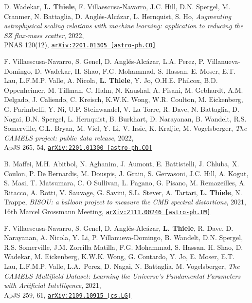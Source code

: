 D. Wadekar, {\bf L. Thiele}, F. Villaescusa-Navarro, J.C. Hill, D.N. Spergel,
M. Cranmer, N. Battaglia, D. Angl\'es-Alc\'azar, L. Hernquist, S. Ho,
\emph{Augmenting astrophysical scaling relations with machine learning:
      application to reducing the SZ flux-mass scatter}, 2022,\\
PNAS 120(12),
\href{https://arxiv.org/abs/2201.01305}{\mbox{\texttt{arXiv:2201.01305 [astro-ph.CO]}}}

F. Villaescusa-Navarro, S. Genel, D. Angl\'es-Alc\'azar,
L.A. Perez, P. Villanueva-Domingo, D. Wadekar, H. Shao,
F.G. Mohammad, S. Hassan, E. Moser, E.T. Lau, L.F.M.P. Valle, A. Nicola,
{\bf L. Thiele}, Y. Jo, O.H.E. Philcox, B.D. Oppenheimer, M. Tillman, C. Hahn,
N. Kaushal, A. Pisani, M. Gebhardt, A.M. Delgado, J. Caliendo,
C. Kreisch, K.W.K. Wong, W.R. Coulton, M. Eickenberg,
G. Parimbelli, Y. Ni, U.P. Steinwandel, V. La Torre,
R. Dave, N. Battaglia, D. Nagai, D.N. Spergel, L. Hernquist, B. Burkhart,
D. Narayanan, B. Wandelt, R.S. Somerville, G.L. Bryan, M. Viel, Y. Li, V. Irsic,
K. Kraljic, M. Vogelsberger,
\emph{The CAMELS project: public data release}, 2022,\\
ApJS 265, 54,
\href{https://arxiv.org/abs/2201.01300}{\mbox{\texttt{arXiv:2201.01300 [astro-ph.CO]}}}

\newpage
\vspace*{0.5cm}

B. Maffei, M.H. Abitbol, N. Aghanim, J. Aumont, E. Battistelli, J. Chluba,
X. Coulon, P. De Bernardis, M. Douspis, J. Grain, S. Gervasoni, J.C. Hill,
A. Kogut, S. Masi, T. Matsumara, C. O Sullivan, L. Pagano, G. Pisano,
M. Remazeilles, A. Ritacco, A. Rotti, V. Sauvage, G. Savini, S.L. Stever,
A. Tartari, {\bf L. Thiele}, N. Trappe,
\emph{BISOU: a balloon project to measure the CMB spectral distortions}, 2021,\\
16th Marcel Grossmann Meeting,
\href{https://arxiv.org/abs/2111.00246}{\mbox{\texttt{arXiv:2111.00246 [astro-ph.IM]}}}

F. Villaescusa-Navarro, S. Genel, D. Angl\'es-Alc\'azar, {\bf L. Thiele},
R. Dave, D. Narayanan, A. Nicola, Y. Li, P. Villanueva-Domingo, B. Wandelt,
D.N. Spergel, R.S. Somerville, J.M. Zorrilla Matilla, F.G. Mohammad, S. Hassan,
H. Shao, D. Wadekar, M. Eickenberg, K.W.K. Wong, G. Contardo, Y. Jo, E. Moser,
E.T. Lau, L.F.M.P. Valle, L.A.~Perez, D. Nagai, N. Battaglia, M. Vogelsberger,
\emph{The CAMELS Multifield Dataset: Learning the Universe's Fundamental
      Parameters with Artificial Intelligence}, 2021,\\
ApJS 259, 61,
\href{https://arxiv.org/abs/2109.10915}{\mbox{\texttt{arXiv:2109.10915 [cs.LG]}}}

